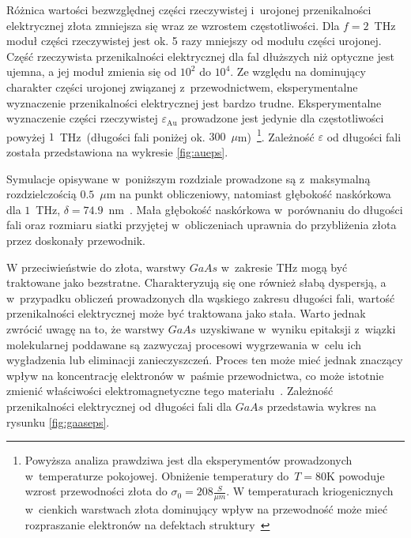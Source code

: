 Różnica wartości bezwzględnej części rzeczywistej i~urojonej przenikalności elektrycznej złota zmniejsza się wraz ze wzrostem częstotliwości. Dla $f=2$~THz moduł części rzeczywistej jest ok. 5 razy mniejszy od modułu części urojonej. Część rzeczywista przenikalności elektrycznej dla fal dłuższych niż optyczne jest ujemna, a jej moduł zmienia się od $10^2$ do $10^4$. Ze względu na dominujący charakter części urojonej związanej z~przewodnictwem, eksperymentalne wyznaczenie przenikalności elektrycznej jest bardzo trudne. Eksperymentalne wyznaczenie części rzeczywistej $\varepsilon_{\textrm{Au}}$ prowadzone jest jedynie dla częstotliwości powyżej $1$~THz~(długości fali poniżej ok. $300$~$\mu$m)~\cite{ordal1983optical}\footnote{Powyższa analiza prawdziwa jest dla eksperymentów prowadzonych w~temperaturze pokojowej. Obniżenie temperatury do~$T=$80K powoduje wzrost przewodności złota do $\sigma_0=208\frac{S}{\mu m}$. W temperaturach kriogenicznych w~cienkich warstwach złota dominujący wpływ na przewodność może mieć rozpraszanie elektronów na defektach struktury~\cite{lide2009crc}}. Zależność $\varepsilon$ od długości fali została przedstawiona na wykresie \ref{fig:aueps}. 

Symulacje opisywane w~poniższym rozdziale prowadzone są z~maksymalną rozdzielczością $0.5$~$\mu$m na punkt obliczeniowy, natomiast głębokość naskórkowa dla $1$~THz, $\delta=74.9$~nm~\cite{lee2009principles}. Mała głębokość naskórkowa w~porównaniu do długości fali oraz rozmiaru siatki przyjętej w~obliczeniach uprawnia do przybliżenia złota przez doskonały przewodnik. 

W przeciwieństwie do złota, warstwy $GaAs$ w~zakresie THz mogą być traktowane jako bezstratne. Charakteryzują się one również słabą dyspersją, a w~przypadku obliczeń prowadzonych dla wąskiego zakresu długości fali, wartość przenikalności elektrycznej może być traktowana jako stała. Warto jednak zwrócić uwagę na to, że warstwy $GaAs$ uzyskiwane w~wyniku epitaksji z~wiązki molekularnej poddawane są zazwyczaj procesowi wygrzewania w~celu ich wygładzenia lub eliminacji zanieczyszczeń. Proces ten może mieć jednak znaczący wpływ na koncentrację elektronów w~paśmie przewodnictwa, co może istotnie zmienić właściwości elektromagnetyczne tego materiału~\cite{zhang2009annealing}. Zależność przenikalności elektrycznej od długości fali dla $GaAs$ przedstawia wykres na rysunku \ref{fig:gaaseps}.
